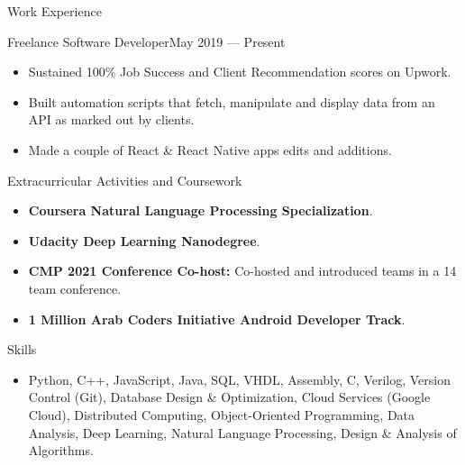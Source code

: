 \documentclass[]{mcdowellcv}
\begin{document}
	\begin{cvsection}{Work Experience}
		\begin{cvsubsection}{Freelance Software Developer}{}{May 2019 — Present}
			\begin{itemize}
				\item Sustained 100\% Job Success and Client Recommendation scores on Upwork.
				\item Built automation scripts that fetch, manipulate and display data from an API as marked out by clients.
				\item Made a couple of React \& React Native apps edits and additions.
			\end{itemize}
		\end{cvsubsection}
	\end{cvsection}
	
	\begin{cvsection}{Extracurricular Activities and Coursework}
		\begin{cvsubsection}{}{}{}
			\begin{itemize}
				\item \textbf{Coursera Natural Language Processing Specialization}.
				\item \textbf{Udacity Deep Learning Nanodegree}.
				\item \textbf{CMP 2021 Conference Co-host:} Co-hosted and introduced teams in a 14 team conference.
				\item \textbf{1 Million Arab Coders Initiative Android Developer Track}.
			\end{itemize}
		\end{cvsubsection}
	\end{cvsection}
	
	\begin{cvsection}{Skills}
		\begin{cvsubsection}{}{}{}
			\begin{itemize}
				\item Python, C++, JavaScript, Java, SQL, VHDL, Assembly, C, Verilog, Version Control (Git), Database Design \& Optimization, Cloud Services (Google Cloud), Distributed Computing, Object-Oriented Programming, Data Analysis, Deep Learning, Natural Language Processing, Design \& Analysis of Algorithms.
			\end{itemize}
		\end{cvsubsection}
	\end{cvsection}
	
\end{document}

